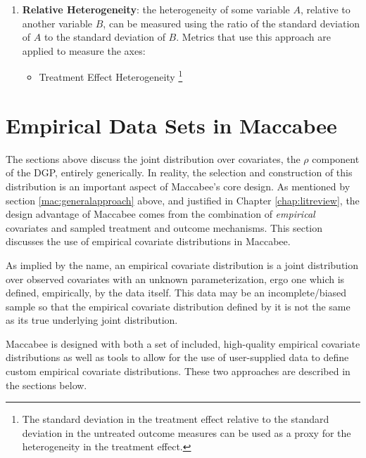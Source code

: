 \documentclass[../main.tex]{subfiles}
\begin{document}
\begin{enumerate}
    \item \textbf{Relative Heterogeneity}: the heterogeneity of some variable $A$, relative to another variable $B$, can be measured using the ratio of the standard deviation of $A$ to the standard deviation of $B$. Metrics that use this approach are applied to measure the axes:

    \begin{itemize}
        \item Treatment Effect Heterogeneity \footnote{The standard deviation in the treatment effect relative to the standard deviation in the untreated outcome measures can be used as a proxy for the heterogeneity in the treatment effect.}
    \end{itemize}
\end{enumerate}

\section{Empirical Data Sets in Maccabee}
\label{mac:data}

The sections above discuss the joint distribution over covariates, the $\rho$ component of the DGP, entirely generically. In reality, the selection and construction of this distribution is an important aspect of Maccabee's core design. As mentioned by section \ref{mac:generalapproach} above, and justified in Chapter \ref{chap:litreview}, the design advantage of Maccabee comes from the combination of \textit{empirical} covariates and sampled treatment and outcome mechanisms. This section discusses the use of empirical covariate distributions in Maccabee.

\vspace{\baselineskip}

As implied by the name, an empirical covariate distribution is a joint distribution over observed covariates with an unknown parameterization, ergo one which is defined, empirically, by the data itself. This data may be an incomplete/biased sample so that the empirical covariate distribution defined by it is not the same as its true underlying joint distribution.

\vspace{\baselineskip}

Maccabee is designed with both a set of included, high-quality empirical covariate distributions as well as tools to allow for the use of user-supplied data to define custom empirical covariate distributions. These two approaches are described in the sections below.
\end{document}
